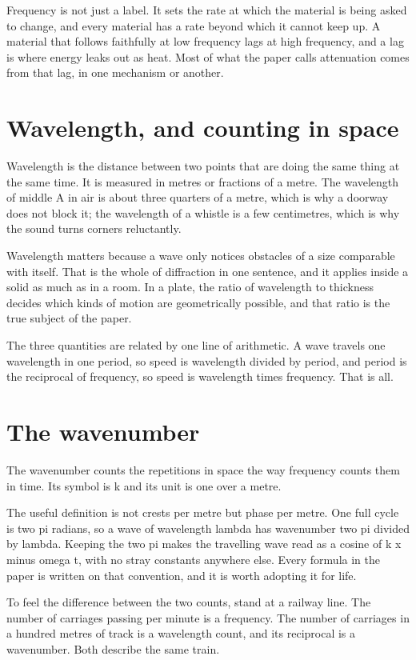 \documentclass[11pt]{article}
\begin{document}
Frequency is not just a label. It sets the rate at which the material is being asked to change, and every
material has a rate beyond which it cannot keep up. A material that follows faithfully at low frequency lags
at high frequency, and a lag is where energy leaks out as heat. Most of what the paper calls attenuation comes
from that lag, in one mechanism or another.

\section{Wavelength, and counting in space}

Wavelength is the distance between two points that are doing the same thing at the same time. It is measured
in metres or fractions of a metre. The wavelength of middle A in air is about three quarters of a metre,
which is why a doorway does not block it; the wavelength of a whistle is a few centimetres, which is why the
sound turns corners reluctantly.

Wavelength matters because a wave only notices obstacles of a size comparable with itself. That is the whole
of diffraction in one sentence, and it applies inside a solid as much as in a room. In a plate, the ratio of
wavelength to thickness decides which kinds of motion are geometrically possible, and that ratio is the true
subject of the paper.

The three quantities are related by one line of arithmetic. A wave travels one wavelength in one period, so
speed is wavelength divided by period, and period is the reciprocal of frequency, so speed is wavelength times
frequency. That is all.

\section{The wavenumber}

The wavenumber counts the repetitions in space the way frequency counts them in time. Its symbol is k and its
unit is one over a metre.

The useful definition is not crests per metre but phase per metre. One full cycle is two pi radians, so a
wave of wavelength lambda has wavenumber two pi divided by lambda. Keeping the two pi makes the travelling
wave read as a cosine of k x minus omega t, with no stray constants anywhere else. Every formula in the paper
is written on that convention, and it is worth adopting it for life.

To feel the difference between the two counts, stand at a railway line. The number of carriages passing per
minute is a frequency. The number of carriages in a hundred metres of track is a wavelength count, and its
reciprocal is a wavenumber. Both describe the same train.
\end{document}
